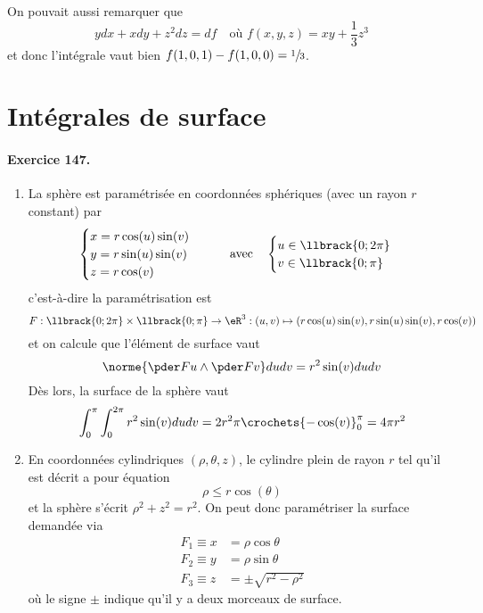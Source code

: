 On pouvait aussi remarquer que
\begin{equation*}
y d x + x d y + z^2 d z = d f \quad\text{où $f(x,y,z) = xy + \frac13 z^3$}
\end{equation*}
et donc l'intégrale vaut bien $f(1,0,1) - f(1,0,0) = \sfrac13$.

\section{Intégrales de surface}





\paragraph{Exercice 147.}
\begin{enumerate}
\item La sphère est paramétrisée en coordonnées sphériques (avec un
rayon $r$ constant) par
\begin{equation*}
\begin{cases}
x = r \cos(u)\sin(v)\\
y = r \sin(u)\sin(v)\\
z = r \cos(v)
\end{cases}\qquad\text{avec}\quad
\begin{cases}
u \in \llbrack{0;2\pi}\\
v \in \llbrack{0;\pi}
\end{cases}
\end{equation*}
c'est-à-dire la paramétrisation est
\begin{equation*}
F : \llbrack{0;2\pi} \times \llbrack{0;\pi} \to \eR^3 : (u,v)
\mapsto (r \cos(u)\sin(v), r\sin(u)\sin(v), r\cos(v))
\end{equation*}
et on calcule que l'élément de surface vaut
\begin{equation*}
\norme{\pder F u \wedge \pder F v} d u d v = r^2 \sin (v) d u d v
\end{equation*}
Dès lors, la surface de la sphère vaut
\begin{equation*}
\int_0^\pi \int_0^{2\pi} r^2 \sin(v) d u d v = 2r^2 \pi \crochets{-\cos(v)}_0^\pi = 4 \pi r^2
\end{equation*}

\item En coordonnées cylindriques $(\rho,\theta,z)$, le cylindre plein
de rayon $r$ tel qu'il est décrit a pour équation
\begin{equation*}
\rho \leq r \cos(\theta)
\end{equation*}
et la sphère s'écrit $\rho^2 + z^2 = r^2$. On peut donc paramétriser
la surface demandée via
\begin{equation*}
\begin{split}
F_1 \equiv x &= \rho \cos \theta\\
F_2 \equiv y &= \rho \sin \theta\\
F_3 \equiv z &= \pm \sqrt{r^2 - \rho^2}
\end{split}
\end{equation*}
où le signe $\pm$ indique qu'il y a deux morceaux de surface.


\end{enumerate}
